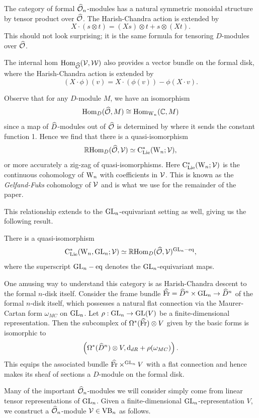 The category of formal $\widehat{\mathcal O}_n$-modules has a natural symmetric monoidal structure by tensor product over $\widehat{\mathcal O}$. The Harish-Chandra action is extended by
\[
X \cdot (s \otimes t) = (X s) \otimes t + s \otimes (Xt). 
\]
This should not look surprising; it is the same formula for tensoring
$D$-modules over $\widehat{\mathcal O}$. 

The internal hom ${\rm Hom}_{\widehat{\mathcal O}}(\mathcal{V},\mathcal{W})$ also provides a vector bundle on the formal disk, 
where the Harish-Chandra action is extended by
\[
(X \cdot \phi)(v) = X \cdot (\phi(v)) - \phi(X\cdot v). 
\]

Observe that for any $D$-module $M$, we have an isomorphism
\[
{\rm Hom}_{D}(\widehat{\mathcal O}, M) \cong {\rm Hom}_{{{\rm W}_n}}(\mathbb C, M)
\]
since a map of $\widehat{D}$-modules out of $\widehat{\mathcal O}$ is determined by where it sends the constant function 1. 
Hence we find that there is a quasi-isomorphism 
\[
\mathbb R{\rm Hom}_{D}(\widehat{\mathcal O}, \mathcal{V}) \simeq {\rm C}_{{\rm Lie}}^*({{\rm W}_n} ; \mathcal{V}),
\]
or more accurately a zig-zag of quasi-isomorphisms. Here
${\rm C}_{{\rm Lie}}^*({{\rm W}_n} ; \mathcal{V})$ is the continuous cohomology of ${{\rm W}_n}$ with
coefficients in $\mathcal{V}$. This is known as the {\em Gelfand-Fuks}
cohomology of $\mathcal{V}$ and is what we use for the remainder of the
paper. 

This relationship extends to the ${\rm GL}_n$-equivariant setting as well, giving us the following result.

\begin{lem}
There is a quasi-isomorphism
\[
{\rm C}_{{\rm Lie}}^*({{\rm W}_n},{\rm GL}_n; \mathcal{V}) \simeq \mathbb R {\rm Hom}_D(\widehat{\mathcal O},\mathcal{V})^{{\rm GL}_n-{\rm eq}},
\]
where the superscript ${\rm GL}_n-{\rm eq}$ denotes the ${\rm GL}_n$-equivariant maps.
\end{lem}

\begin{rmk}
One amusing way to understand this category is as Harish-Chandra descent to the formal $n$-disk itself. 
Consider the frame bundle $\widehat{{\rm Fr}} = \widehat{D}^n \times {\rm GL}_n \to \widehat{D}^n$ of the formal $n$-disk itself, 
which possesses a natural flat connection via the Maurer-Cartan form $\omega_{MC}$ on ${\rm GL}_n$. 
Let $\rho: {\rm GL}_n \to {\rm GL}(V)$ be a finite-dimensional representation. 
Then the subcomplex of $\Omega^*(\widehat{{\rm Fr}})\otimes V$ given by the basic forms is isomorphic to
\[
\left(\Omega^*(\widehat{D}^n) \otimes V, {\rm d}_{dR} + \rho(\omega_{MC}) \right).
\]
This equips the associated bundle $\widehat{{\rm Fr}}\times^{{\rm GL}_n} V$ with a flat connection and 
hence makes its sheaf of sections a $D$-module on the formal disk.
\end{rmk}

Many of the important $\widehat{\mathcal O}_n$-modules we will consider simply come from linear tensor representations of ${\rm GL}_n$. 
Given a finite-dimensional ${\rm GL}_n$-representation $V$, we construct a $\widehat{\mathcal O}_n$-module $\mathcal{V} \in {\rm VB}_n$ as follows. 

